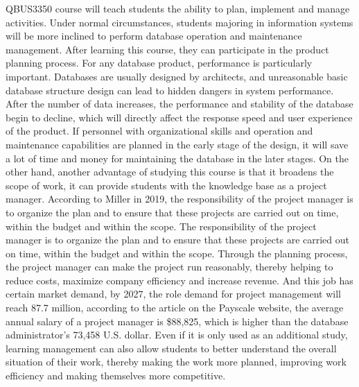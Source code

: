 \documentclass[12pt]{article}
\begin{document}
QBUS3350 course will teach students the ability to plan, implement and manage activities. Under normal circumstances, students majoring in information systems will be more inclined to perform database operation and maintenance management. After learning this course, they can participate in the product planning process. For any database product, performance is particularly important. Databases are usually designed by architects, and unreasonable basic database structure design can lead to hidden dangers in system performance. After the number of data increases, the performance and stability of the database begin to decline, which will directly affect the response speed and user experience of the product. If personnel with organizational skills and operation and maintenance capabilities are planned in the early stage of the design, it will save a lot of time and money for maintaining the database in the later stages. On the other hand, another advantage of studying this course is that it broadens the scope of work, it can provide students with the knowledge base as a project manager. According to Miller in 2019, the responsibility of the project manager is to organize the plan and to ensure that these projects are carried out on time, within the budget and within the scope. The responsibility of the project manager is to organize the plan and to ensure that these projects are carried out on time, within the budget and within the scope. Through the planning process, the project manager can make the project run reasonably, thereby helping to reduce costs, maximize company efficiency and increase revenue. And this job has certain market demand, by 2027, the role demand for project management will reach 87.7 million, according to the article on the Payscale website, the average annual salary of a project manager is \$88,825, which is higher than the database administrator's 73,458 U.S. dollar. Even if it is only used as an additional study, learning management can also allow students to better understand the overall situation of their work, thereby making the work more planned, improving work efficiency and making themselves more competitive.
\end{document}
